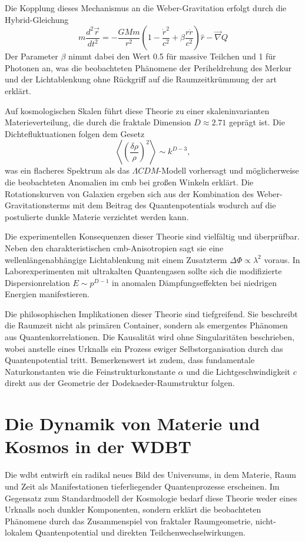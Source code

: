 Die Kopplung dieses Mechanismus an die Weber-Gravitation erfolgt durch die Hybrid-Gleichung
\begin{equation}
    m \frac{d^2 \vec{r}}{dt^2} = -\frac{GMm}{r^2} \left( 1 - \frac{\dot{r}^2}{c^2} + \beta \frac{r \ddot{r}}{c^2} \right) \hat{r} - \vec{\nabla} Q
\end{equation}
Der Parameter $\beta$ nimmt dabei den Wert 0.5 für massive Teilchen und 1 für Photonen an, was die beobachteten Phänomene der Periheldrehung des Merkur und der Lichtablenkung ohne
Rückgriff auf die Raumzeitkrümmung der \gls{art} erklärt.

Auf kosmologischen Skalen führt diese Theorie zu einer skaleninvarianten Materieverteilung, die durch die fraktale Dimension $D \approx 2.71$ geprägt ist. Die Dichtefluktuationen folgen
dem Gesetz
\begin{equation}
    \left\langle \left( \frac{\delta \rho}{\rho} \right)^2 \right\rangle \sim k^{D-3},
\end{equation}
was ein flacheres Spektrum als das $\varLambda CDM$-Modell vorhersagt und möglicherweise die beobachteten Anomalien im \gls{cmb} bei großen Winkeln erklärt. Die Rotationskurven von Galaxien
ergeben sich aus der Kombination des Weber-Gravitationsterms mit dem Beitrag des Quantenpotentials wodurch auf die postulierte dunkle Materie verzichtet werden kann.

Die experimentellen Konsequenzen dieser Theorie sind vielfältig und überprüfbar. Neben den charakteristischen \gls{cmb}-Anisotropien sagt sie eine wellenlängenabhängige Lichtablenkung
mit einem Zusatzterm $\Delta \Phi \propto \lambda^{2}$ voraus. In Laborexperimenten mit ultrakalten Quantengasen sollte sich die modifizierte Dispersionrelation $E \sim p^{D-1}$ in anomalen
Dämpfungseffekten bei niedrigen Energien manifestieren.

Die philosophischen Implikationen dieser Theorie sind tiefgreifend. Sie beschreibt die Raumzeit nicht als primären Container, sondern als emergentes Phänomen aus Quantenkorrelationen.
Die Kausalität wird ohne Singularitäten beschrieben, wobei anstelle eines Urknalls ein Prozess ewiger Selbstorganisation durch das Quantenpotential tritt. Bemerkenswert ist zudem, dass
fundamentale Naturkonstanten wie die Feinstrukturkonstante $\alpha$ und die Lichtgeschwindigkeit $c$ direkt aus der Geometrie der Dodekaeder-Raumstruktur folgen.

\section{Die Dynamik von Materie und Kosmos in der WDBT}
Die \gls{wdbt} entwirft ein radikal neues Bild des Universums, in dem Materie, Raum und Zeit als Manifestationen tieferliegender Quantenprozesse erscheinen. Im Gegensatz zum Standardmodell
der Kosmologie bedarf diese Theorie weder eines Urknalls noch dunkler Komponenten, sondern erklärt die beobachteten Phänomene durch das Zusammenspiel von fraktaler Raumgeometrie, nicht-lokalem
Quantenpotential und direkten Teilchenwechselwirkungen.

